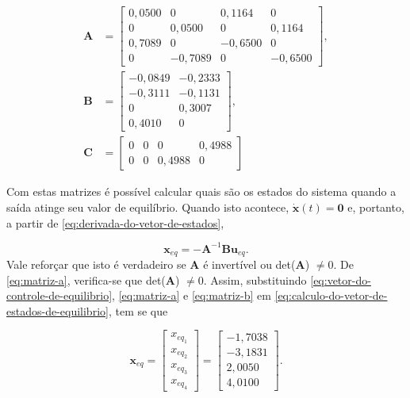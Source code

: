 \begin{subequations}
    \label{eq:matrizes-do-espaco-de-estados}
    \begin{align}
        \mathbf{A} & =
        \begin{bmatrix}
            \label{eq:matriz-a}
            0,0500 & 0       & 0,1164  & 0       \\
            0      & 0,0500  & 0       & 0,1164  \\
            0,7089 & 0       & -0,6500 & 0       \\
            0      & -0,7089 & 0       & -0,6500
        \end{bmatrix},  \\
        \mathbf{B} & =
        \begin{bmatrix}
            \label{eq:matriz-b}
            -0,0849 & -0,2333 \\
            -0,3111 & -0,1131 \\
            0       & 0,3007  \\
            0,4010  & 0
        \end{bmatrix}, \\
        \mathbf{C} & =
        \begin{bmatrix}
            \label{eq:matriz-c}
            0 & 0 & 0      & 0,4988 \\
            0 & 0 & 0,4988 & 0
        \end{bmatrix} 
    \end{align}
\end{subequations}

Com estas matrizes é possível calcular quais são os estados do sistema quando a
saída atinge seu valor de equilíbrio. Quando isto acontece, $\mathbf{\dot{x}}(t)
= \mathbf{0}$ e, portanto, a partir de \ref{eq:derivada-do-vetor-de-estados},

\begin{equation}
    \label{eq:calculo-do-vetor-de-estados-de-equilibrio}
    \mathbf{x}_{eq} = -\mathbf{A}^{-1}\mathbf{B}\mathbf{u}_{eq}.
\end{equation} Vale reforçar que isto é verdadeiro se $\mathbf{A}$ é invertível
ou det($\mathbf{A}$) $\neq 0$. De \ref{eq:matriz-a}, verifica-se que
det($\mathbf{A}$) $\neq 0$. Assim, substituindo
\ref{eq:vetor-do-controle-de-equilibrio}, \ref{eq:matriz-a} e \ref{eq:matriz-b}
em \ref{eq:calculo-do-vetor-de-estados-de-equilibrio}, tem se que

\begin{equation}
    \label{eq:estados-de-equilibrio}
    \mathbf{x}_{eq} =
    \begin{bmatrix}
        x_{eq_{1}} \\
        x_{eq_{2}} \\
        x_{eq_{3}} \\
        x_{eq_{4}}
    \end{bmatrix}
    =
    \begin{bmatrix}
        -1,7038 \\
        -3,1831 \\
        2,0050  \\
        4,0100
    \end{bmatrix}\text{.}
\end{equation}

